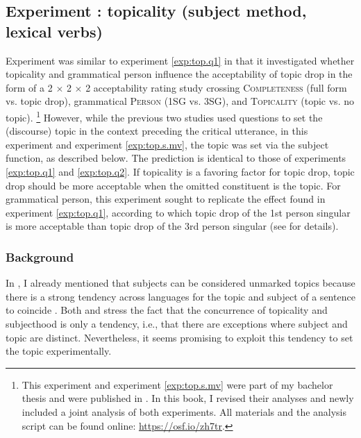 \subsection{Experiment : topicality (subject method, lexical verbs) }
\label{sec:exp.top.s.fv}
Experiment  was similar to experiment \ref*{exp:top.q1} in that it investigated whether topicality and grammatical person influence the acceptability of topic drop in the form of a  2 $\times$ 2 $\times$ 2 acceptability rating study crossing \textsc{Completeness} (full form vs. topic drop), grammatical \textsc{Person} (1SG vs. 3SG), and \textsc{Topicality} (topic vs. no topic).%
\footnote{This experiment and experiment \ref*{exp:top.s.mv} were part of my bachelor thesis \citep{schafer2019} and were published in \citet{schafer2021}.
In this book, I revised their analyses and newly included a joint analysis of both experiments.
All materials and the analysis script can be found online: \url{https://osf.io/zh7tr}.
}
%
However, while the previous two studies used questions to set the (discourse) topic in the context preceding the critical utterance, in this experiment and experiment \ref*{exp:top.s.mv}, the topic was set via the subject function, as described below.
The prediction is identical to those of experiments \ref*{exp:top.q1} and \ref*{exp:top.q2}. 
If topicality is a favoring factor for topic drop, topic drop should be more acceptable when the omitted constituent is the topic.
For grammatical person, this experiment sought to replicate the effect found in experiment \ref*{exp:top.q1}, according to which topic drop of the 1st person singular is more acceptable than topic drop of the 3rd person singular (see  for details).

\subsubsection{Background}\label{exp:top.s.fv.background}
In , I already mentioned that subjects can be considered unmarked topics \citep[62]{reinhart1981} because there is a strong tendency across languages for the topic and subject of a sentence to coincide \citep[132]{lambrecht1994}.
Both \citet{reinhart1981} and \citet{lambrecht1994} stress the fact that the concurrence of topicality and subjecthood is only a tendency, i.e., that there are exceptions where subject and topic are distinct.
Nevertheless, it seems promising to exploit this tendency to set the topic experimentally. 

